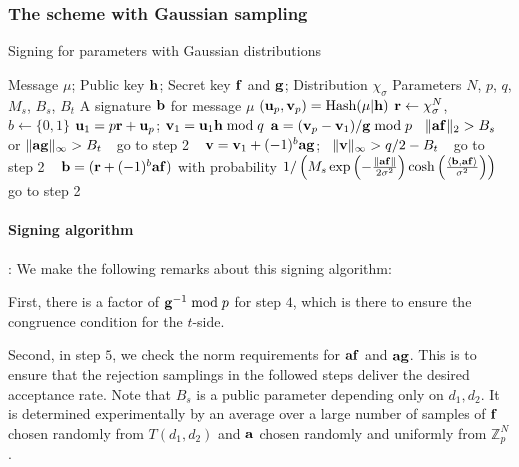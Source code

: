 \documentclass{llncs}
\newcommand{\ZZ}{\mathbb{Z}}
\newcommand{\bfa}{{\bf a}}
\newcommand{\bfb}{{\bf b}}
\newcommand{\bff}{{\bf f}}
\newcommand{\bfg}{{\bf g}}
\newcommand{\bfh}{{\bf h}}
\newcommand{\bfr}{{\bf r}}
\newcommand{\bfu}{{\bf u}}
\newcommand{\bfv}{{\bf v}}
\newcommand{\bfS}{{\bf S}}
\newcommand{\<}{\langle}
\renewcommand{\>}{\rangle}
\newcommand{\LineIf}[2]{ \STATE \algorithmicif\ {#1}\ \algorithmicthen\ {#2} \algorithmicend\ \algorithmicif }
\begin{document}

\subsubsection{The scheme with Gaussian sampling}


\begin{algorithm}
\caption{Signing for parameters with Gaussian distributions}
\begin{algorithmic}[1]
\REQUIRE Message $\mu$; Public key $\bfh$; Secret key $\bff$ and $\bfg$; Distribution $\chi_\sigma$
\REQUIRE Parameters $N$, $p$, $q$, $M_s$, $B_s$, $B_t$
\ENSURE A signature $\bfb$ for message $\mu$
\STATE $(\bfu_p,\bfv_p)= \text{Hash}(\mu|\bfh)$
\STATE $ \bfr \gets \chi_\sigma^N$, $b \gets \{0,1\}$
\STATE $\bfu_1 = p\bfr+\bfu_p $; $\bfv_1 = \bfu_1\bfh\bmod q$
\STATE $\bfa = (\bfv_p-\bfv_1)/\bfg \bmod p$
\LineIf {$\|\bfa\bff\|_2>B_s$ or $\|\bfa\bfg\|_\infty>B_t$} {go to step 2}
\STATE $\bfv = \bfv_1+ (-1)^b\bfa\bfg$; %
\LineIf {$\|\bfv\|_\infty>q/2-B_t$} {go to step 2}
\RETURN $\bfb = (\bfr+(-1)^b\bfa\bff)$ with probability $1/\left(M_s \exp\left(-\frac{\|\bfa\bff\|}{2\sigma^2}\right)\cosh\left(\frac{\left<\bfb,\bfa\bff\right>}{\sigma^2}\right) \right)$
\STATE go to step 2
\end{algorithmic}
\end{algorithm}
\paragraph{Signing algorithm}:
We make the following remarks about this signing algorithm:

First, there is a factor of $\bfg^{-1}\bmod p$
for step $4$, which is there to ensure the congruence condition for the $t$-side. 

Second, in step $5$, we check the norm requirements for $\bfa\bff$ and $\bfa\bfg$. 
This is to ensure that the rejection samplings in the followed steps 
deliver the desired acceptance rate.   Note that $B_s$ is a public parameter depending only on $d_1,d_2$.   It is determined experimentally by an average over a large number of samples of $\bff$ chosen randomly from $T(d_1,d_2)$ and $\bfa$ chosen randomly and uniformly from $\ZZ_p^N$.
\end{document}
